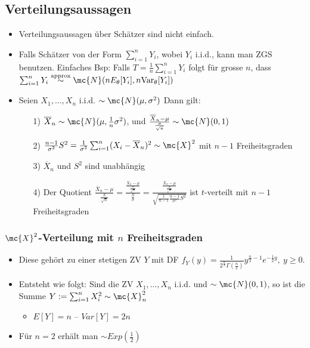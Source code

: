 \subsection{Verteilungsaussagen}
\begin{itemize}
    \item Verteilungsaussagen über Schätzer sind nicht einfach.
    \item Falls Schätzer von der Form $\sum_{i=1}^{n} Y_i$, wobei $Y_i$ i.i.d., kann man ZGS benutzen. Einfaches Bsp: Falls $T = \frac{1}{n} \sum_{i=1}^{n} Y_i$ folgt für grosse $n$, dass $\sum_{i=1}^{n} Y_i \overset{\text{approx}}{\sim} \mc{N}(n E_\theta[Y_i], n \text{Var}_\theta[Y_i])$
    \item Seien $X_1, \dots, X_n$ i.i.d. $\sim \mc{N}(\mu, \sigma^2)$ Dann gilt:
        \begin{itemize}
            \item[1)] $\overline{X}_n \sim \mc{N}(\mu, \frac{1}{n} \sigma^2)$, und $\frac{\overline{X}_n - \mu}{\frac{\sigma}{\sqrt{n}}} \sim \mc{N}(0, 1)$
            \item[2)] $\frac{n - 1}{\sigma^2}S^2 = \frac{1}{\sigma^2}\sum_{i=1}^{n} (X_i - \overline{X}_n)^2 \sim \mc{X}^2$ mit $n - 1$ Freiheitsgraden
            \item[3)] $\overline{X}_n$ und $S^2$ sind unabhängig
            \item[4)] Der Quotient $\frac{\overline{X}_n - \mu}{\frac{S}{\sqrt{n}}} = \frac{\frac{\overline{X}_n - \mu}{\frac{\sigma}{\sqrt{n}}}}{\frac{S}{\sigma}} = \frac{\frac{\overline{X}_n - \mu}{\frac{\sigma}{\sqrt{n}}}}{\sqrt{\frac{1}{n - 1}\frac{n - 1}{\sigma^2}S^2}}$ ist $t$-verteilt mit $n - 1$ Freiheitsgraden
        \end{itemize}
\end{itemize}

\subsubsection{$\mc{X}^2$-Verteilung mit $n$ Freiheitsgraden}
\begin{itemize}
    \item Diese gehört zu einer stetigen ZV $Y$ mit DF $f_Y(y) = \frac{1}{2^{\frac{n}{2}} \Gamma(\frac{n}{2})}y^{\frac{n}{2} - 1}e^{-\frac{1}{2}y}, \ y \ge 0$.
    \item Entsteht wie folgt: Sind die ZV $X_1, \dots, X_n$ i.i.d. und $\sim \mc{N}(0, 1)$, so ist die Summe $Y := \sum_{i=1}^{n} X_i^2 \sim \mc{X}_n^2$
        \begin{itemize}
            \item $E[Y] = n$ \quad -- $Var[Y] = 2n$
        \end{itemize}
    \item Für $n = 2$ erhält man $\sim Exp(\frac{1}{2})$
\end{itemize}

